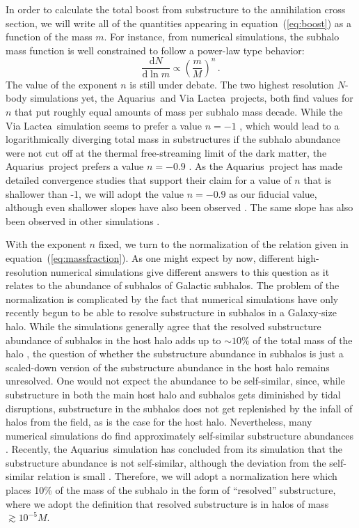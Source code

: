 \documentclass[aps,prd,twocolumn,amsmath,amssymb,floatfix,nofootinbib,10pt]{revtex4}
\newcommand{\VL}{Via Lactea}
\newcommand{\aquarius}{Aquarius}
\newcommand{\dd}{\mathrm{d}}
\newcommand{\eqnname}{equation}
\begin{document}
In order to calculate the total boost from substructure to the
annihilation cross section, we will write all of the quantities
appearing in \eqnname\ (\ref{eq:boost}) as a function of the mass
$m$. For instance, from numerical simulations, the subhalo mass
function is well constrained to follow a power-law type behavior:
\begin{equation}\label{eq:massfraction}
\frac{\dd N}{\dd \ln m}
\propto \left(\frac{m}{M}\right)^n\, .
\end{equation}
The value of the exponent $n$ is still under debate. The two highest
resolution $N$-body simulations yet, the \aquarius\ and \VL\
projects, both find values for $n$ that put roughly equal amounts of
mass per subhalo mass decade. While the \VL\ simulation seems to
prefer a value $n = -1$
\cite{2006ApJ...649....1D,2008ApJ...686..262K}, which would lead to a
logarithmically diverging total mass in substructures if the subhalo
abundance were not cut off at the thermal free-streaming limit of the
dark matter, the \aquarius\ project prefers a value $n = -0.9$
\cite{2008MNRAS.391.1685S}. As the \aquarius\ project has made
detailed convergence studies that support their claim for a value of
$n$ that is shallower than -1, we will adopt the value $n = -0.9$ as
our fiducial value, although even shallower slopes have also been
observed \cite{2002PhRvD..66f3502H}. The same slope has also been
observed in other simulations \cite{2004MNRAS.355..819G}.

With the exponent $n$ fixed, we turn to the normalization of the
relation given in \eqnname\ (\ref{eq:massfraction}). As one might
expect by now, different high-resolution numerical simulations give
different answers to this question as it relates to the abundance of
subhalos of Galactic subhalos. The problem of the normalization is
complicated by the fact that numerical simulations have only recently
begun to be able to resolve substructure in subhalos in a Galaxy-size
halo. While the simulations generally agree that the resolved
substructure abundance of subhalos in the host halo adds up to
$\sim\!10$\% of the total mass of the halo
\cite{1998MNRAS.300..146G,1999ApJ...522...82K,2004MNRAS.353..624D,2003ApJ...598...49Z,2007ApJ...657..262D,2007ApJ...667..859D},
the question of whether the substructure abundance in subhalos is just
a scaled-down version of the substructure abundance in the host halo
remains unresolved. One would not expect the abundance to be
self-similar, since, while substructure in both the main host halo and
subhalos gets diminished by tidal disruptions, substructure in the
subhalos does not get replenished by the infall of halos from the
field, as is the case for the host halo. Nevertheless, many numerical
simulations do find approximately self-similar substructure abundances
\cite{1999ApJ...524L..19M,2007ApJ...659.1082S}. Recently, the
\aquarius\ simulation has concluded from its simulation that the
substructure abundance is not self-similar, although the deviation
from the self-similar relation is small
\cite{2008MNRAS.391.1685S}. Therefore, we will adopt a normalization
here which places 10\% of the mass of the subhalo in the form of
``resolved'' substructure, where we adopt the definition that resolved
substructure is in halos of mass $\gtrsim 10^{-5} M$.
\end{document}

